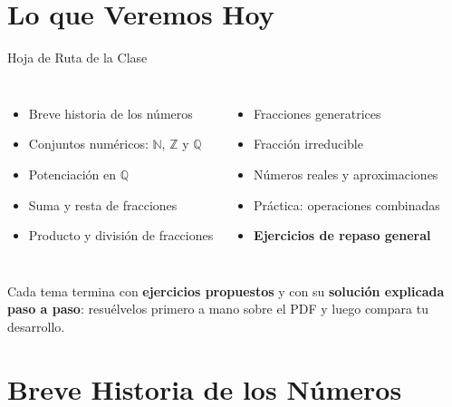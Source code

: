 \documentclass[aspectratio=169]{beamer}
\begin{document}
\begin{frame}[plain]
  \titlepage
\end{frame}

\section{Lo que Veremos Hoy}

\begin{frame}{Hoja de Ruta de la Clase}
  \begin{columns}[T]
    \begin{itemize}
      \item Breve historia de los números
      \item Conjuntos numéricos: $\mathbb{N}$, $\mathbb{Z}$ y $\mathbb{Q}$
      \item Potenciación en $\mathbb{Q}$
      \item Suma y resta de fracciones
      \item Producto y división de fracciones
    \end{itemize}
    \begin{itemize}
      \item Fracciones generatrices
      \item Fracción irreducible
      \item Números reales y aproximaciones
      \item Práctica: operaciones combinadas
      \item \textbf{Ejercicios de repaso general}
    \end{itemize}
  \end{columns}
  \vspace{4pt}
  \begin{mwpasos}
    Cada tema termina con \textbf{ejercicios propuestos} y con su
    \textbf{solución explicada paso a paso}: resuélvelos primero a mano
    sobre el PDF y luego compara tu desarrollo.
  \end{mwpasos}
\end{frame}

\section{Breve Historia de los Números}
\end{document}
